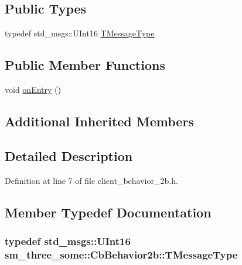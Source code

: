 \subsection*{Public Types}
\begin{DoxyCompactItemize}
\item 
typedef std\+\_\+msgs\+::\+U\+Int16 \hyperlink{classsm__three__some_1_1CbBehavior2b_a5e1cc985fc4075a11c44e9706aab1d14}{T\+Message\+Type}
\end{DoxyCompactItemize}
\subsection*{Public Member Functions}
\begin{DoxyCompactItemize}
\item 
void \hyperlink{classsm__three__some_1_1CbBehavior2b_ab04f8cba845a4300f475af94441a4030}{on\+Entry} ()
\end{DoxyCompactItemize}
\subsection*{Additional Inherited Members}


\subsection{Detailed Description}


Definition at line 7 of file client\+\_\+behavior\+\_\+2b.\+h.



\subsection{Member Typedef Documentation}
\subsubsection[{\texorpdfstring{T\+Message\+Type}{TMessageType}}]{\setlength{\rightskip}{0pt plus 5cm}typedef std\+\_\+msgs\+::\+U\+Int16 {\bf sm\+\_\+three\+\_\+some\+::\+Cb\+Behavior2b\+::\+T\+Message\+Type}}\hypertarget{classsm__three__some_1_1CbBehavior2b_a5e1cc985fc4075a11c44e9706aab1d14}{}\label{classsm__three__some_1_1CbBehavior2b_a5e1cc985fc4075a11c44e9706aab1d14}


